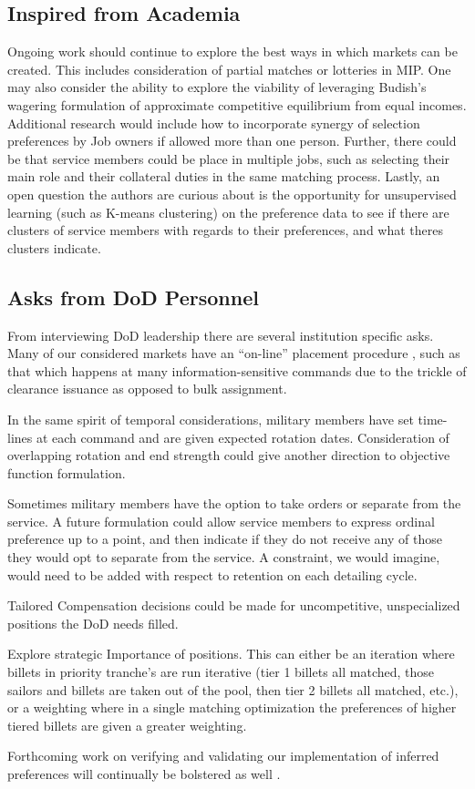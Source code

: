 \subsection{Inspired from Academia}

Ongoing work should continue to explore the best ways in which markets can be created. This includes consideration of partial matches or lotteries in MIP.\cite{1993_Roth} One may also consider the ability to explore the viability of leveraging Budish's wagering formulation of approximate competitive equilibrium from equal incomes.  \cite{2011_Budish} Additional research would include how to incorporate synergy of selection preferences by Job owners if allowed more than one person. \cite{1985_Roth_b}  Further, there could be that service members could be place in multiple jobs, such as selecting their main role and their collateral duties in the same matching process. \cite{1982_Roth} Lastly, an open question the authors are curious about is the opportunity for unsupervised learning (such as K-means clustering) on the preference data to see if there are clusters of service members with regards to their preferences, and what theres clusters indicate.

\subsection{Asks from DoD Personnel}

From interviewing DoD leadership there are several institution specific asks. Many of our considered markets have an “on-line” placement procedure \cite{1994_Khuller}, such as that which happens at many information-sensitive commands due to the trickle of clearance issuance as opposed to bulk assignment. 

In the same spirit of temporal considerations, military members have set time-lines at each command and are given expected rotation dates. Consideration of overlapping rotation and end strength could give another direction to objective function formulation.

Sometimes military members have the option to take orders or separate from the service. A future formulation could allow service members to express ordinal preference up to a point, and then indicate if they do not receive any of those they would opt to separate from the service. A constraint, we would imagine, would need to be added with respect to retention on each detailing cycle.

Tailored Compensation decisions could be made for uncompetitive, unspecialized positions the DoD needs filled.

Explore strategic Importance of positions. This can either be an iteration where billets in priority tranche's are run iterative (tier 1 billets all matched, those sailors and billets are taken out of the pool, then tier 2 billets all matched, etc.), or a weighting where in a single matching optimization the preferences of higher tiered billets are given a greater weighting.

Forthcoming work on verifying and validating our implementation of inferred preferences will continually be bolstered as well \cite{2019_Shaw}.
